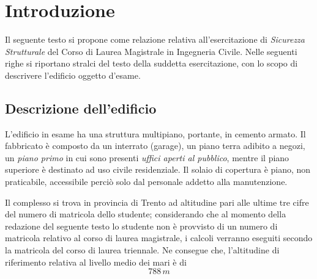 \pagestyle{plain}
\chapter{Introduzione}\label{chap:intro}
Il seguente testo si propone come relazione relativa all'esercitazione di \emph{Sicurezza Strutturale} del Corso di Laurea Magistrale in Ingegneria Civile. Nelle seguenti righe si riportano stralci del testo della suddetta esercitazione, con lo scopo di descrivere l'edificio oggetto d'esame.

\section{Descrizione dell'edificio}\label{sec:descrizioneEdificio}
L'edificio in esame ha una struttura multipiano, portante, in cemento armato. Il fabbricato è composto da un interrato (garage), un piano terra adibito a negozi, un \emph{piano primo} in cui sono presenti \emph{uffici aperti al pubblico}, mentre il piano superiore è destinato ad uso civile residenziale. Il solaio di copertura è piano, non praticabile, accessibile perciò solo dal personale addetto alla manutenzione.

Il complesso si trova in provincia di Trento ad altitudine pari alle ultime tre cifre del numero di matricola dello studente; considerando che al momento della redazione del seguente testo lo studente non è provvisto di un numero di matricola relativo al corso di laurea magistrale, i calcoli verranno eseguiti secondo la matricola del corso di laurea triennale. Ne consegue che, l'altitudine di riferimento relativa al livello medio dei mari è di
\begin{equation*}
 788\,m
\end{equation*}


